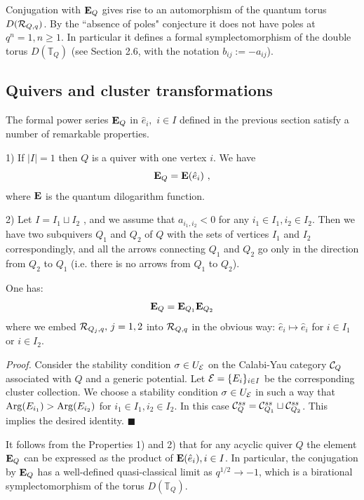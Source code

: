 \documentclass[12pt]{article}
\begin{document}
Conjugation with ${\bf E}_Q$ gives rise to an automorphism of the quantum torus $D({\cal R}_{Q,q})$. By the ``absence of poles" conjecture it does not have poles at $q^n=1, n\geqslant 1$. In particular it defines a formal symplectomorphism of the double torus
$D({\mathbb T}_Q)$ (see  Section 2.6, with the notation $b_{ij}:=-a_{ij}$).




\subsection{Quivers and cluster transformations}

The formal power series  ${\bf E}_Q$ in $\hat{e}_i,\,\,i\in I$ defined in the previous section satisfy a number of remarkable properties.

1) If $|I|=1$ then $Q$ is a quiver with one vertex $i$. We have
$${\bf E}_Q={\bf E}(\hat{e}_i)\,\,,$$
where ${\bf E}$ is the  quantum dilogarithm function.


2) Let $I=I_1\sqcup I_2$ , and we assume that $a_{i_1,i_2}<0$ for any $i_1\in I_1, i_2\in I_2$. Then we have two subquivers $Q_1$ and $Q_2$ of $Q$ with the sets of vertices $I_1$ and $I_2$ correspondingly, and all the arrows connecting $Q_1$ and $Q_2$ go only in the
 direction from $Q_2$ to $Q_1$ (i.e. there is no arrows from $Q_1$ to $Q_2$).

\begin{prp} One has:
$${\bf E}_Q={\bf E}_{Q_1}{\bf E}_{Q_2}$$
where we embed ${\cal R}_{Q_j,q},\,j=1,2$ into ${\cal R}_{Q,q}$ in the obvious way: $\hat{e}_i \mapsto \hat{e}_i$ for $i\in I_1$ or $i\in I_2$.

\end{prp}
{\it Proof.} Consider the stability condition $\sigma\in U_{{\cal E}}$ on the Calabi-Yau category ${\mathcal C}_Q$ associated with $Q$ and a generic potential. Let ${\cal E}=\{E_i\}_{i\in I}$ be the corresponding cluster collection. We choose a stability condition $\sigma\in U_{{\cal E}}$  in such a way that $\operatorname{Arg}(E_{i_1})>\operatorname{Arg}(E_{i_2})$ for $i_1\in I_1, i_2\in I_2$. In this case ${\mathcal C}^{ss}_Q={\mathcal C}^{ss}_{Q_1}\sqcup {\mathcal C}^{ss}_{Q_2}$. This implies the desired identity. $\blacksquare$

\begin{rmk} It follows from the Properties 1) and 2) that for any acyclic quiver $Q$ the element
${\bf E}_Q$ can be expressed as the product of ${\bf E}(\hat{e}_i), i\in I$. In particular, the conjugation by ${\bf E}_Q$ has a well-defined quasi-classical limit as $q^{1/2}\to -1$, which is a birational symplectomorphism of the torus $D({\mathbb T}_Q)$.

\end{rmk}
\end{document}
